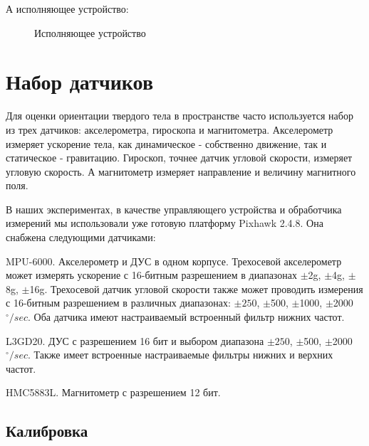 \documentclass[a4paper]{article}
\begin{document}
А исполняющее устройство:

\begin{figure}[h!]
	\caption{Исполняющее устройство}
	\label{fig:isp_ustr}
\end{figure}

\section{Набор датчиков}

Для оценки ориентации твердого тела в пространстве часто используется набор из трех датчиков: акселерометра, гироскопа и магнитометра. Акселерометр измеряет ускорение тела, как динамическое - собственно движение, так и статическое - гравитацию. Гироскоп, точнее датчик угловой скорости, измеряет угловую скорость. А магнитометр измеряет направление и величину магнитного поля.

В наших экспериментах, в качестве управляющего устройства и обработчика измерений мы использовали уже готовую платформу Pixhawk 2.4.8. Она снабжена следующими датчиками:

MPU-6000. Акселерометр и ДУС в одном корпусе. Трехосевой акселерометр может измерять ускорение с 16-битным разрешением в диапазонах $\pm$2g, $\pm$4g, $\pm$8g, $\pm$16g. Трехосевой датчик угловой скорости также может проводить измерения с 16-битным разрешением в различных диапазонах: $\pm250$, $\pm$500, $\pm$1000, $\pm$2000 $^\circ /sec$. Оба датчика имеют настраиваемый встроенный фильтр нижних частот.

L3GD20. ДУС с разрешением 16 бит и выбором диапазона $\pm250$, $\pm$500, $\pm$2000 $^\circ /sec$. Также имеет встроенные настраиваемые фильтры нижних и верхних частот.

HMC5883L. Магнитометр с разрешением 12 бит.

\subsection{Калибровка}
\end{document}
